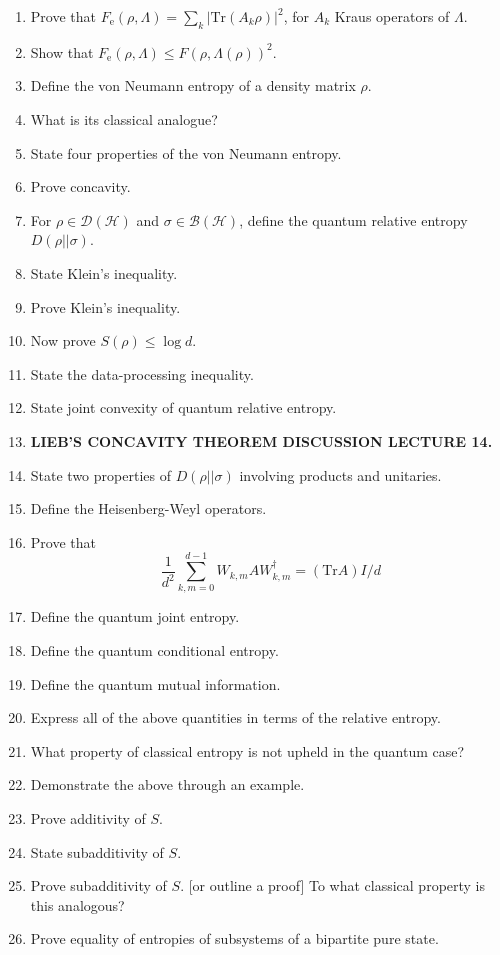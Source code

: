 \documentclass{article}
\renewcommand{\rm}[1]{\mathrm{#1}}
\newcommand{\mc}[1]{\mathcal{#1}}
\begin{document}
\begin{enumerate}
    \item Prove that $F_\rm{e}(\rho,\Lambda) = \sum_{k}|\rm{Tr}(A_k\rho)|^2$, for $A_k$ Kraus operators of $\Lambda$.
    \item Show that $F_\rm{e}(\rho,\Lambda)\le F(\rho,\Lambda(\rho))^2$.
    \item Define the von Neumann entropy of a density matrix $\rho$.
    \item What is its classical analogue?
    \item State four properties of the von Neumann entropy.
    \item Prove concavity.
    \item For $\rho \in \mc{D}(\mc{H})$ and $\sigma \in \mc{B}(\mc{H})$, define the quantum relative entropy $D(\rho||\sigma)$.
    \item State Klein's inequality.
    \item Prove Klein's inequality.
    \item Now prove $S(\rho)\le \log d$.
    \item State the data-processing inequality.
    \item State joint convexity of quantum relative entropy.
    \item \textbf{LIEB'S CONCAVITY THEOREM DISCUSSION LECTURE 14.}
    \item State two properties of $D(\rho||\sigma)$ involving products and unitaries.
    \item Define the Heisenberg-Weyl operators.
    \item Prove that $$\frac{1}{d^2}\sum_{k,m=0}^{d-1}W_{k,m}AW^\dagger_{k,m} = (\rm{Tr}A)I/d$$
    \item Define the quantum joint entropy.
    \item Define the quantum conditional entropy.
    \item Define the quantum mutual information.
    \item Express all of the above quantities in terms of the relative entropy.
    \item What property of classical entropy is not upheld in the quantum case?
    \item Demonstrate the above through an example.
    \item Prove additivity of $S$.
    \item State subadditivity of $S$.
    \item Prove subadditivity of $S$. [or outline a proof] To what classical property is this analogous?
    \item Prove equality of entropies of subsystems of a bipartite pure state.

\end{enumerate}
\end{document}
